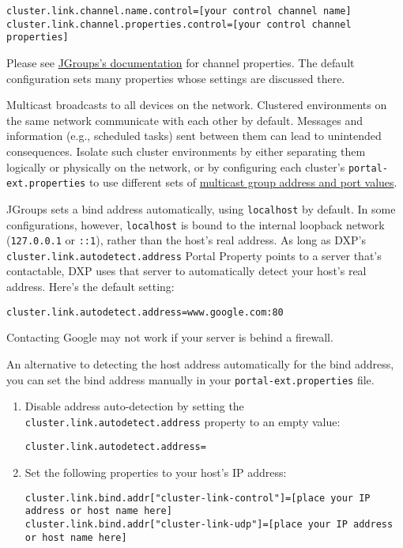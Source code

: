 \begin{verbatim}
cluster.link.channel.name.control=[your control channel name]
cluster.link.channel.properties.control=[your control channel properties]
\end{verbatim}

Please see
\href{http://www.jgroups.org/manual/index.html\#protlist}{JGroups's
documentation} for channel properties. The default configuration sets
many properties whose settings are discussed there.

Multicast broadcasts to all devices on the network. Clustered
environments on the same network communicate with each other by default.
Messages and information (e.g., scheduled tasks) sent between them can
lead to unintended consequences. Isolate such cluster environments by
either separating them logically or physically on the network, or by
configuring each cluster's \texttt{portal-ext.properties} to use
different sets of
\href{https://docs.liferay.com/portal/7.0-latest/propertiesdoc/portal.properties.html\#Multicast}{multicast
group address and port values}.

JGroups sets a bind address automatically, using \texttt{localhost} by
default. In some configurations, however, \texttt{localhost} is bound to
the internal loopback network (\texttt{127.0.0.1} or \texttt{::1}),
rather than the host's real address. As long as DXP's
\texttt{cluster.link.autodetect.address} Portal Property points to a
server that's contactable, DXP uses that server to automatically detect
your host's real address. Here's the default setting:

\begin{verbatim}
cluster.link.autodetect.address=www.google.com:80
\end{verbatim}

Contacting Google may not work if your server is behind a firewall.

An alternative to detecting the host address automatically for the bind
address, you can set the bind address manually in your
\texttt{portal-ext.properties} file.

\begin{enumerate}
\def\labelenumi{\arabic{enumi}.}
\item
  Disable address auto-detection by setting the
  \texttt{cluster.link.autodetect.address} property to an empty value:

\begin{verbatim}
cluster.link.autodetect.address=
\end{verbatim}
\item
  Set the following properties to your host's IP address:

\begin{verbatim}
cluster.link.bind.addr["cluster-link-control"]=[place your IP address or host name here]
cluster.link.bind.addr["cluster-link-udp"]=[place your IP address or host name here]
\end{verbatim}
\end{enumerate}

